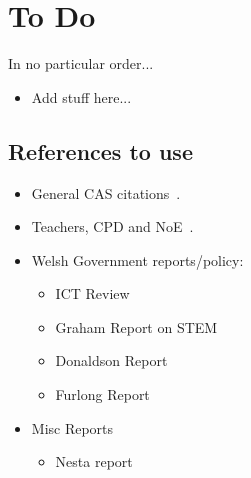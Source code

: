 \documentclass{sig-alternate}
\begin{document}
\section*{To Do}

In no particular order...

\begin{itemize}
\item Add stuff here...
\end{itemize}

\subsection*{References to use}
\begin{itemize}
\item
General CAS
citations~\cite{crick+sentance:2011,brown-et-al-sigcse2012,brown-et-al-toce2014}.

\item
Teachers, CPD and
NoE~\cite{sentance-et-al-wipsce2012,sentance-et-al:2013,sentance-et-al:2014}.

\item
Welsh Government reports/policy:
\begin{itemize}
\item
ICT Review~\cite{welshictreview:2013}
\item
Graham Report on STEM~\cite{STEMreview:2014}
\item
Donaldson Report~\cite{Donaldson:2015}
\item
Furlong Report~\cite{Furlong:2015}
\end{itemize}

\item
Misc Reports
\begin{itemize}
\item
Nesta report~\cite{NESTA:2015}

\end{itemize}
\end{itemize}
\end{document}

